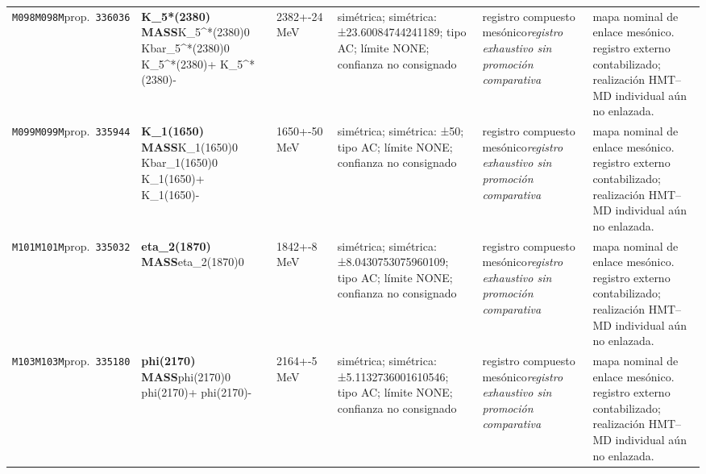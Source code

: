\begin{landscape}
\begin{longtable}{L{1.85cm}L{4.45cm}L{2.35cm}L{4.05cm}L{3.35cm}L{7.15cm}}
\texttt{M098}\newline \texttt{M098M}\newline prop.\ \texttt{336036} & \textbf{K\_\allowbreak{}5*(2380) MASS}\newline K\_\allowbreak{}5\textasciicircum{}*(2380)0 \textbar{}\allowbreak{} Kbar\_\allowbreak{}5\textasciicircum{}*(2380)0 \textbar{}\allowbreak{} K\_\allowbreak{}5\textasciicircum{}*(2380)+ \textbar{}\allowbreak{} K\_\allowbreak{}5\textasciicircum{}*(2380)- & 2382+-24\,MeV & simétrica; simétrica: ±23.60084744241189; tipo AC; límite NONE; confianza no consignado & registro compuesto mesónico\newline \emph{registro exhaustivo sin promoción comparativa} & mapa nominal de enlace mesónico. registro externo contabilizado; realización HMT--MD individual aún no enlazada. \\
\texttt{M099}\newline \texttt{M099M}\newline prop.\ \texttt{335944} & \textbf{K\_\allowbreak{}1(1650) MASS}\newline K\_\allowbreak{}1(1650)0 \textbar{}\allowbreak{} Kbar\_\allowbreak{}1(1650)0 \textbar{}\allowbreak{} K\_\allowbreak{}1(1650)+ \textbar{}\allowbreak{} K\_\allowbreak{}1(1650)- & 1650+-50\,MeV & simétrica; simétrica: ±50; tipo AC; límite NONE; confianza no consignado & registro compuesto mesónico\newline \emph{registro exhaustivo sin promoción comparativa} & mapa nominal de enlace mesónico. registro externo contabilizado; realización HMT--MD individual aún no enlazada. \\
\texttt{M101}\newline \texttt{M101M}\newline prop.\ \texttt{335032} & \textbf{eta\_\allowbreak{}2(1870) MASS}\newline eta\_\allowbreak{}2(1870)0 & 1842+-8\,MeV & simétrica; simétrica: ±8.0430753075960109; tipo AC; límite NONE; confianza no consignado & registro compuesto mesónico\newline \emph{registro exhaustivo sin promoción comparativa} & mapa nominal de enlace mesónico. registro externo contabilizado; realización HMT--MD individual aún no enlazada. \\
\texttt{M103}\newline \texttt{M103M}\newline prop.\ \texttt{335180} & \textbf{phi(2170) MASS}\newline phi(2170)0 \textbar{}\allowbreak{} phi(2170)+ \textbar{}\allowbreak{} phi(2170)- & 2164+-5\,MeV & simétrica; simétrica: ±5.1132736001610546; tipo AC; límite NONE; confianza no consignado & registro compuesto mesónico\newline \emph{registro exhaustivo sin promoción comparativa} & mapa nominal de enlace mesónico. registro externo contabilizado; realización HMT--MD individual aún no enlazada. \\

\end{longtable}
\end{landscape}
